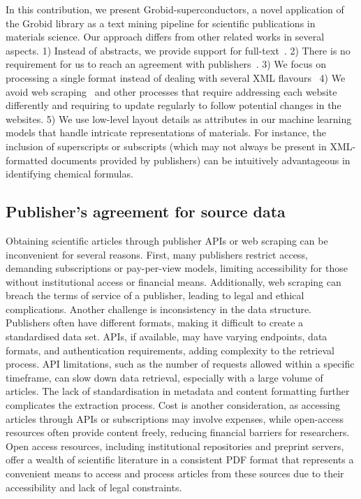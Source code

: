 In this contribution, we present Grobid-superconductors, a novel application of the Grobid library as a text mining pipeline for scientific publications in materials science.
Our approach differs from other related works in several aspects. 
1) Instead of abstracts, we provide support for full-text~\cite{mitsui2023automatic}.
2) There is no requirement for us to reach an agreement with publishers~\cite{kononova2019text}.
3) We focus on processing a single format instead of dealing with several XML flavours~\cite{kononova2019text}
4) We avoid web scraping~\cite{court2020magnetic} and other processes that require addressing each website differently and requiring to update regularly to follow potential changes in the websites.
5) We use low-level layout details as attributes in our machine learning models that handle intricate representations of materials. For instance, the inclusion of superscripts or subscripts (which may not always be present in XML-formatted documents provided by publishers) can be intuitively advantageous in identifying chemical formulas.

\subsection{Publisher's agreement for source data}
Obtaining scientific articles through publisher APIs or web scraping can be inconvenient for several reasons. First, many publishers restrict access, demanding subscriptions or pay-per-view models, limiting accessibility for those without institutional access or financial means. Additionally, web scraping can breach the terms of service of a publisher, leading to legal and ethical complications.
Another challenge is inconsistency in the data structure. Publishers often have different formats, making it difficult to create a standardised data set. 
APIs, if available, may have varying endpoints, data formats, and authentication requirements, adding complexity to the retrieval process.
API limitations, such as the number of requests allowed within a specific timeframe, can slow down data retrieval, especially with a large volume of articles. The lack of standardisation in metadata and content formatting further complicates the extraction process.
Cost is another consideration, as accessing articles through APIs or subscriptions may involve expenses, while open-access resources often provide content freely, reducing financial barriers for researchers.
Open access resources, including institutional repositories and preprint servers, offer a wealth of scientific literature in a consistent PDF format that represents a convenient means to access and process articles from these sources due to their accessibility and lack of legal constraints.

